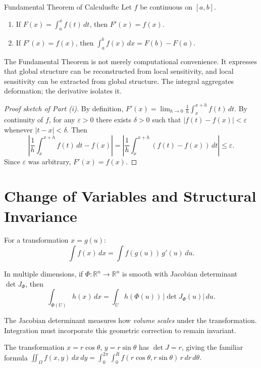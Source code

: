 \documentclass[12pt,openany]{book}
\newcommand{\R}{\mathbb{R}}
\begin{document}
\begin{theorem}{Fundamental Theorem of Calculus}{ftc}
  Let $f$ be continuous on $[a,b]$.
  \begin{enumerate}[label=(\roman*)]
    \item If $F(x) = \int_a^x f(t)\,dt$, then $F'(x) = f(x)$.
    \item If $F'(x)=f(x)$, then $\int_a^b f(x)\,dx = F(b)-F(a)$.
  \end{enumerate}
\end{theorem}

\begin{insight}
  The Fundamental Theorem is not merely computational convenience. It expresses
  that global structure can be reconstructed from local sensitivity, and local
  sensitivity can be extracted from global structure. The integral aggregates
  deformation; the derivative isolates it.
\end{insight}

\begin{proof}[Proof sketch of Part (i)]
  By definition,
  $F'(x) = \lim_{h\to 0}\frac{1}{h}\int_x^{x+h}f(t)\,dt.$
  By continuity of $f$, for any $\varepsilon>0$ there exists $\delta>0$ such
  that $|f(t)-f(x)|<\varepsilon$ whenever $|t-x|<\delta$. Then
  \[
    \left|\frac{1}{h}\int_x^{x+h}f(t)\,dt - f(x)\right|
    = \left|\frac{1}{h}\int_x^{x+h}(f(t)-f(x))\,dt\right|
    \le \varepsilon.
  \]
  Since $\varepsilon$ was arbitrary, $F'(x)=f(x)$.
\end{proof}

\section{Change of Variables and Structural Invariance}

For a transformation $x=g(u)$:
\[
  \int f(x)\,dx = \int f(g(u))\,g'(u)\,du.
\]

In multiple dimensions, if $\Phi:\R^n\to\R^n$ is smooth with Jacobian
determinant $\det J_\Phi$, then
\[
  \int_{\Phi(U)} h(x)\,dx = \int_U h(\Phi(u))\,|\det J_\Phi(u)|\,du.
\]

The Jacobian determinant measures how \emph{volume scales} under the
transformation. Integration must incorporate this geometric correction to remain
invariant.

\begin{example}
  The transformation $x=r\cos\theta$, $y=r\sin\theta$ has
  $\det J = r$, giving the familiar formula
  $\iint_\Omega f(x,y)\,dx\,dy = \int_0^{2\pi}\int_0^R f(r\cos\theta,
  r\sin\theta)\,r\,dr\,d\theta.$
\end{example}
\end{document}
